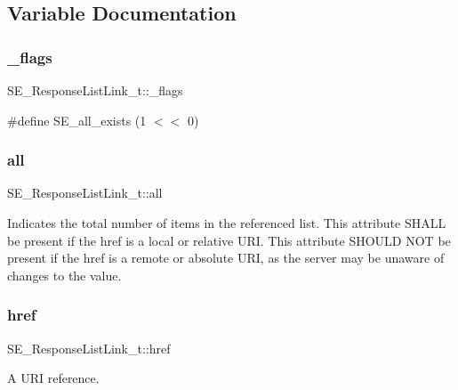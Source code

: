 \subsection{Variable Documentation}
\mbox{\label{group__ResponseListLink_ga54194415a4458904a89ba172148b82e8}} 
\subsubsection{\texorpdfstring{\+\_\+flags}{\_flags}}
{\footnotesize\ttfamily S\+E\+\_\+\+Response\+List\+Link\+\_\+t\+::\+\_\+flags}

\#define S\+E\+\_\+all\+\_\+exists (1 $<$$<$ 0) \mbox{\label{group__ResponseListLink_ga5cf19fe8f4b95dc44ce8305d28fb9fd8}} 
\subsubsection{\texorpdfstring{all}{all}}
{\footnotesize\ttfamily S\+E\+\_\+\+Response\+List\+Link\+\_\+t\+::all}

Indicates the total number of items in the referenced list. This attribute S\+H\+A\+LL be present if the href is a local or relative U\+RI. This attribute S\+H\+O\+U\+LD N\+OT be present if the href is a remote or absolute U\+RI, as the server may be unaware of changes to the value. \mbox{\label{group__ResponseListLink_ga48bb0add8ae3c93f524b731f596f1343}} 
\subsubsection{\texorpdfstring{href}{href}}
{\footnotesize\ttfamily S\+E\+\_\+\+Response\+List\+Link\+\_\+t\+::href}

A U\+RI reference. 